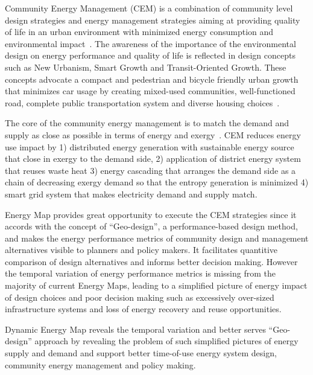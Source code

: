\documentclass[hidelinks,12pt]{article}
\begin{document}
Community Energy Management (CEM) is a combination of community level
design strategies and energy management strategies aiming at providing
quality of life in an urban environment with minimized energy
consumption and environmental impact~\cite{Jaccard19971065}. The
awareness of the importance of the environmental design on energy
performance and quality of life is reflected in design concepts such
as New Urbanism, Smart Growth and Transit-Oriented Growth. These
concepts advocate a compact and pedestrian and bicycle friendly urban
growth that minimizes car usage by creating mixed-used communities,
well-functioned road, complete public transportation system and
diverse housing choices~\cite{smartGrowthWiki}.

The core of the community energy management is to match the demand and
supply as close as possible in terms of energy and
exergy~\cite{Dobbelsteen2013}. CEM reduces energy use impact by 1)
distributed energy generation with sustainable energy source that
close in exergy to the demand side, 2) application of district energy
system that reuses waste heat 3) energy cascading that arranges the
demand side as a chain of decreasing exergy demand so that the entropy
generation is minimized 4) smart grid system that makes electricity
demand and supply match.

Energy Map provides great opportunity to execute the CEM strategies
since it accords with the concept of ``Geo-design'', a
performance-based design method, and makes the energy performance
metrics of community design and management alternatives visible to
planners and policy makers. It facilitates quantitive comparison of
design alternatives and informs better decision making. However the
temporal variation of energy performance metrics is missing from the
majority of current Energy Maps, leading to a simplified picture of
energy impact of design choices and poor decision making such as
excessively over-sized infrastructure systems and loss of energy
recovery and reuse opportunities.

Dynamic Energy Map reveals the temporal variation and better serves
``Geo-design'' approach by revealing the problem of such simplified
pictures of energy supply and demand and support better time-of-use
energy system design, community energy management and policy making.
\end{document}
